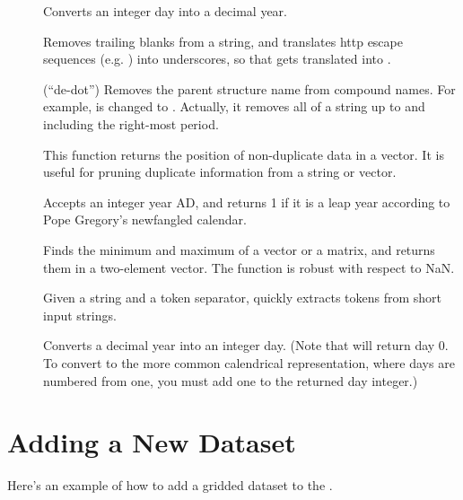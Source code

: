 \begin{description}
    
\item[] Converts an integer day into a decimal year.

\item[] Removes trailing blanks from a string, and
  translates http escape sequences (e.g. ) into underscores,
  so that  gets translated into
  .
  
\item[] (``de-dot'') Removes the parent structure name
  from compound names. For example,  is changed
  to .  Actually, it removes all of a string up to
  and including the right-most period.

\item[] This function returns the position of
  non-duplicate data in a vector.  It is useful for pruning duplicate
  information from a string or vector.

\item[] Accepts an integer year AD, and returns 1 if it is
  a leap year according to Pope Gregory's newfangled calendar.

\item[] Finds the minimum and maximum of a vector or a
  matrix, and returns them in a two-element vector.  The function is
  robust with respect to NaN.
  
\item[] Given a string and a token separator, quickly
  extracts tokens from short input strings.

\item[] Converts a decimal year into an integer day.
  (Note that  will return day 0.  To convert to the more
  common calendrical representation, where days are numbered from one,
  you must add one to the returned day integer.)

\end{description}


\section{Adding a New Dataset}
\label{gui,adding,manifest.lcl}

Here's an example of how to add a gridded dataset to the \GUI.


